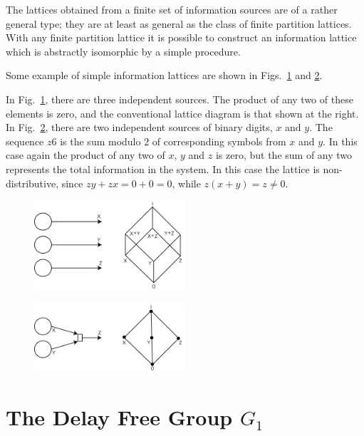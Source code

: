 \documentclass{article}[12pt, letter]
\begin{document}
The lattices obtained from a finite set of information sources are of a rather general type; they are at least as general as the class of finite partition lattices. With any finite partition lattice it is possible to construct an information lattice which is abstractly isomorphic by a simple procedure.

\noindent Some example of simple information lattices are shown in Figs.~\ref{fig:1} and \ref{fig:2}.

In Fig.~\ref{fig:1}, there are three independent sources. The product of any two of these elements is zero, and the conventional lattice diagram is that shown at the right. In Fig.~\ref{fig:2}, there are two independent sources of binary digits, $x$ and $y$. The sequence $z6$ is the sum modulo $2$ of corresponding symbols from $x$ and $y$. In this case again the product of any two of $x$, $y$ and $z$ is zero, but the sum of any two represents the total information in the system. In this case the lattice is non-distributive, since $z y + z x = 0 + 0 = 0$, while $z (x+y) = z \neq 0$.

\begin{figure}
	\begin{center}
		\includegraphics[width=0.5\textwidth]{figs/fig1.png}
		\end{center}
	\caption{}\label{fig:1}
\end{figure}

\begin{figure}
	\begin{center}
		\includegraphics[width=0.5\textwidth]{figs/fig2.png}
	\end{center}
	\caption{}\label{fig:2}
\end{figure}
	


\section{The Delay Free Group $G_1$}
\end{document}
